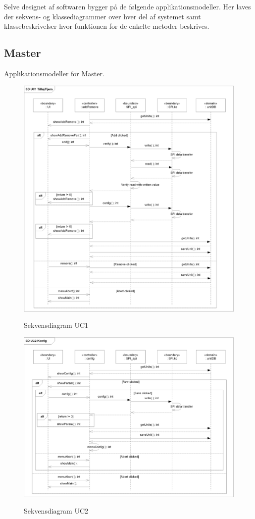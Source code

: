 
Selve designet af softwaren bygger på de følgende applikationsmodeller. Her laves der sekvens- og klassediagrammer over hver del af systemet samt klassebeskrivelser hvor funktionen for de enkelte metoder beskrives.

\subsection{Master}
Applikationsmodeller for Master.

\begin{figure}[htbp] \centering
{\includegraphics[scale=0.8]{filer/design/a_uc1}}
\caption{Sekvensdiagram UC1}
\label{fig:Sekvensdiagram UC1}
\end{figure} 

\begin{figure}[htbp] \centering
{\includegraphics[scale=0.8]{filer/design/a_uc2}}
\caption{Sekvensdiagram UC2}
\label{fig:Sekvensdiagram UC2}
\end{figure} 

